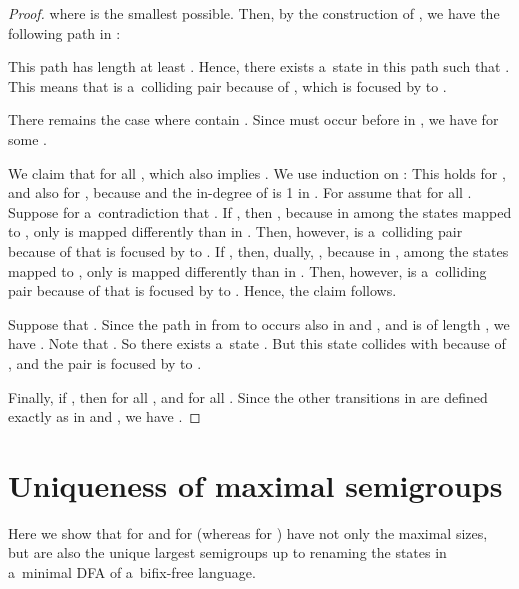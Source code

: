 \documentclass{amsart}
\begin{document}
\begin{proof}
where  is the smallest possible.
Then, by the construction of , we have the following path in :

This path has length at least .
Hence, there exists a~state  in this path such that .
This means that  is a~colliding pair because of , which is focused by  to .

There remains the case where  contain .
Since  must occur before  in , we have  for some .

We claim that  for all , which also implies .
We use induction on :
This holds for , and also for , because  and the in-degree of  is 1 in .
For  assume that  for all .
Suppose for a~contradiction that .
If , then ,
because in  among the states mapped to , only  is mapped differently than in .
Then, however,  is a~colliding pair because of  that is focused by  to .
If , then, dually, ,
because in , among the states mapped to , only  is mapped differently than in .
Then, however,  is a~colliding pair because of  that is focused by  to .
Hence, the claim follows.

Suppose that .
Since the path in  from  to  occurs also in  and , and is of length , we have .
Note that .
So there exists a~state .
But this state collides with  because of , and the pair  is focused by  to .

Finally, if , then  for all , and  for all .
Since the other transitions in  are defined exactly as in  and , we have .
\end{proof}

\section{Uniqueness of maximal semigroups}

Here we show that  for  and  for  (whereas  for ) have not only the maximal sizes, but are also the unique largest semigroups up to renaming the states in a~minimal DFA  of a~bifix-free language.
\end{document}
